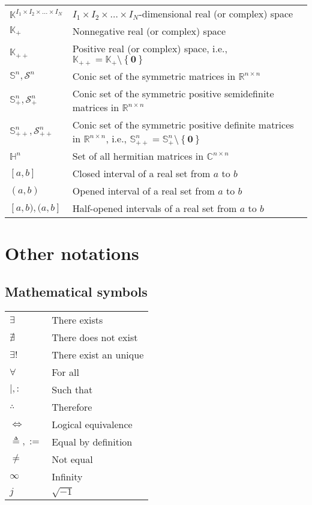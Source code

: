 \documentclass{article}
\begin{document}
\begin{xltabular}{\textwidth}{XX}
    \(\mathbb{K}^{I_1\times I_2 \times \dots \times I_N}\) & \(I_1\times I_2 \times \dots \times I_N\)-dimensional real (or complex) space\\
    \(\mathbb{K}_{+}\) & Nonnegative real (or complex) space\\
    \(\mathbb{K}_{++}\) & Positive real (or complex) space, i.e., \(\mathbb{K}_{++} = \mathbb{K}_{+}\setminus\left\{ \mathbf{0} \right\}\)\\
    \(\mathbb{S}^{n}, \mathcal{S}^{n}\) & Conic set of the symmetric matrices in \(\mathbb{R}^{n\times n}\)\\
    \(\mathbb{S}_{+}^{n}, \mathcal{S}_{+}^{n}\) & Conic set of the symmetric positive semidefinite matrices in \(\mathbb{R}^{n\times n}\)\\
    \(\mathbb{S}_{++}^{n}, \mathcal{S}_{++}^{n}\) & Conic set of the symmetric positive definite matrices in \(\mathbb{R}^{n\times n}\), i.e., \(\mathbb{S}_{++}^{n} = \mathbb{S}_{+}^{n}\setminus \left\{ \mathbf{0} \right\}\)\\
    \(\mathbb{H}^{n}\) & Set of all hermitian matrices in \(\mathbb{C}^{n\times n}\)\\
    \([a, b]\) & Closed interval of a real set from \(a\) to \(b\)\\
    \((a, b)\) & Opened interval of a real set from \(a\) to \(b\)\\
    \([a, b), (a, b]\) & Half-opened intervals of a real set from \(a\) to \(b\)\\
\end{xltabular}

\section{Other notations}
\subsection{Mathematical symbols}
\begin{xltabular}{\textwidth}{XX}
    \(\exists\) & There exists\\
    \(\nexists\) & There does not exist\\
    \(\exists!\) & There exist an unique\\
    \(\forall\) & For all\\
    \(\mid, :\) & Such that\\
    \(\therefore\) & Therefore\\
    \(\iff\) & Logical equivalence\\
    \(\triangleq, :=\) & Equal by definition\\
    \(\neq\) & Not equal\\
    \(\infty\) & Infinity\\
    \(j\) & \(\sqrt{-1}\)
\end{xltabular}
\end{document}
